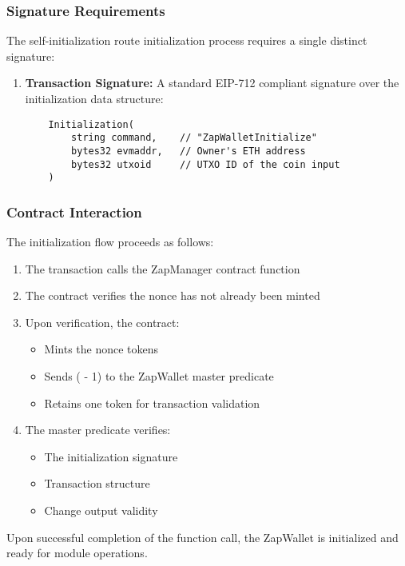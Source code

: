 \subsubsection{Signature Requirements}
The self-initialization route initialization process requires a single distinct signature:
\begin{enumerate}
    \item \textbf{Transaction Signature:} A standard EIP-712 compliant signature over the initialization data structure:
    \begin{small}
    \begin{verbatim}
    Initialization(
        string command,    // "ZapWalletInitialize"
        bytes32 evmaddr,   // Owner's ETH address
        bytes32 utxoid     // UTXO ID of the coin input
    )
    \end{verbatim}
    \end{small}
\end{enumerate}

\subsubsection{Contract Interaction}
The initialization flow proceeds as follows:
\begin{enumerate}
    \item The transaction calls the ZapManager contract  function
    \item The contract verifies the nonce has not already been minted
    \item Upon verification, the contract:
        \begin{itemize}
            \item Mints the nonce tokens
            \item Sends ( - 1) to the ZapWallet master predicate
            \item Retains one token for transaction validation
        \end{itemize}
    \item The master predicate verifies:
        \begin{itemize}
            \item The initialization signature
            \item Transaction structure
            \item Change output validity
        \end{itemize}
\end{enumerate}

Upon successful completion of the  function call, the ZapWallet is initialized and ready for module operations.